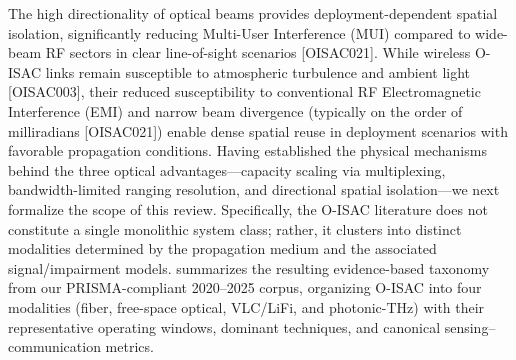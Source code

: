 \markdownRendererUlEndTight \markdownRendererInterblockSeparator
{}
\markdownRendererSectionEnd \markdownRendererSectionBegin
{}\markdownRendererInterblockSeparator
{}The high directionality of optical beams provides deployment-dependent spatial isolation, significantly reducing Multi-User Interference (MUI) compared to wide-beam RF sectors in clear line-of-sight scenarios [O\markdownRendererUnderscore{}ISAC\markdownRendererUnderscore{}021]. While wireless O-ISAC links remain susceptible to atmospheric turbulence and ambient light [O\markdownRendererUnderscore{}ISAC\markdownRendererUnderscore{}003], their reduced susceptibility to conventional RF Electromagnetic Interference (EMI) and narrow beam divergence (typically on the order of milliradians [O\markdownRendererUnderscore{}ISAC\markdownRendererUnderscore{}021]) enable dense spatial reuse in deployment scenarios with favorable propagation conditions.\markdownRendererInterblockSeparator
{}
\markdownRendererSectionEnd 
\markdownRendererSectionEnd \markdownRendererSectionBegin
{}\markdownRendererInterblockSeparator
{}Having established the physical mechanisms behind the three optical advantages—capacity scaling via multiplexing, bandwidth-limited ranging resolution, and directional spatial isolation—we next formalize the scope of this review. Specifically, the O-ISAC literature does not constitute a single monolithic system class; rather, it clusters into distinct modalities determined by the propagation medium and the associated signal/impairment models.  summarizes the resulting evidence-based taxonomy from our PRISMA-compliant 2020–2025 corpus, organizing O-ISAC into four modalities (fiber, free-space optical, VLC/LiFi, and photonic-THz) with their representative operating windows, dominant techniques, and canonical sensing–communication metrics.\markdownRendererParagraphSeparator
{}\markdownRendererInterblockSeparator

